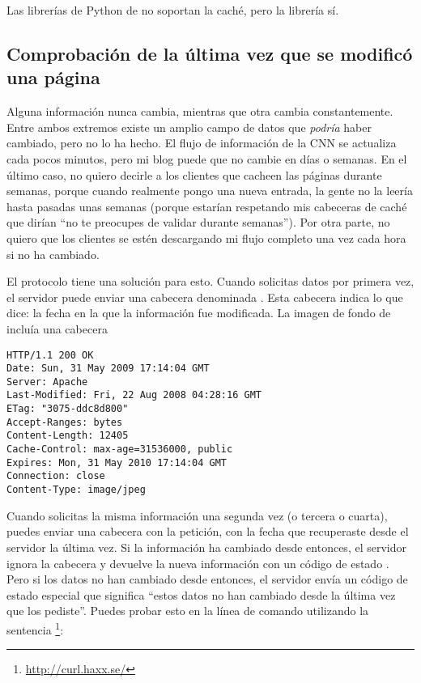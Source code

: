 Las librerías de Python de  no soportan la caché, pero la librería  sí.

\subsection{Comprobación de la última vez que se modificó una página}

 Alguna información nunca cambia, mientras que otra cambia constantemente. Entre ambos extremos existe un amplio campo de datos que \emph{podría} haber cambiado, pero no lo ha hecho. El flujo de información de la CNN se actualiza cada pocos minutos, pero mi blog puede que no cambie en días o semanas. En el último caso, no quiero decirle a los clientes que cacheen las páginas durante semanas, porque cuando realmente pongo una nueva entrada, la gente no la leería  hasta pasadas unas semanas (porque estarían respetando mis cabeceras de caché que dirían ``no te preocupes de validar durante semanas''). Por otra parte, no quiero que los clientes se estén descargando mi flujo completo una vez cada hora si no ha cambiado.


El protocolo  tiene una solución para esto. Cuando solicitas datos por primera vez, el servidor puede enviar una cabecera denominada . Esta cabecera indica lo que dice: la fecha en la que la información fue modificada. La imagen de fondo de  incluía una cabecera 

\noindent\begin{minipage}{\textwidth}
\begin{lstlisting}[mathescape=True]
HTTP/1.1 200 OK
Date: Sun, 31 May 2009 17:14:04 GMT
Server: Apache
Last-Modified: Fri, 22 Aug 2008 04:28:16 GMT
ETag: "3075-ddc8d800"
Accept-Ranges: bytes
Content-Length: 12405
Cache-Control: max-age=31536000, public
Expires: Mon, 31 May 2010 17:14:04 GMT
Connection: close
Content-Type: image/jpeg
\end{lstlisting}
\end{minipage}

Cuando solicitas la misma información una segunda vez (o tercera o cuarta), puedes enviar una cabecera  con la petición, con la fecha que recuperaste desde el servidor la última vez. Si la información ha cambiado desde entonces, el servidor ignora la cabecera  y devuelve la nueva información con un código de estado . Pero si los datos no han cambiado desde entonces, el servidor envía un código de estado especial  que significa ``estos datos no han cambiado desde la última vez que los pediste''. Puedes probar esto en la línea de comando utilizando la sentencia \footnote{\href{http://curl.haxx.se/}{http://curl.haxx.se/}}:

